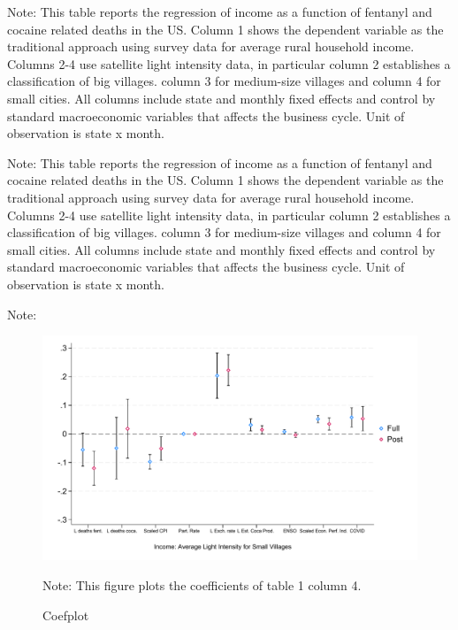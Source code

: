 \documentclass[12 pt,fullpage]{article}
\theoremstyle{plain}
\begin{document}
\newpage
\begin{table}[h!]
	\begin{center}
		\scalebox{0.6}{
			}
		\caption{}
	\end{center}
\end{table}
\vspace{-3mm}
\footnotesize Note: This table reports the regression of income as a function of fentanyl and cocaine related deaths in the US. Column 1 shows the dependent variable as the traditional approach using survey data for average rural household income. Columns 2-4 use satellite light intensity data, in particular column 2 establishes a classification of big villages. column 3 for medium-size villages and column 4 for small cities. All columns include state and monthly fixed effects and control by standard macroeconomic variables that affects the business cycle. Unit of observation is state x month. 

\newpage
\begin{table}[h!]
	\begin{center}
		\scalebox{0.6}{
			}
		\caption{}
	\end{center}
\end{table}
\vspace{-3mm}
\footnotesize Note: This table reports the regression of income as a function of fentanyl and cocaine related deaths in the US. Column 1 shows the dependent variable as the traditional approach using survey data for average rural household income. Columns 2-4 use satellite light intensity data, in particular column 2 establishes a classification of big villages. column 3 for medium-size villages and column 4 for small cities. All columns include state and monthly fixed effects and control by standard macroeconomic variables that affects the business cycle. Unit of observation is state x month. 

\newpage
\begin{table}[h!]
	\begin{center}
		\scalebox{0.6}{
			}
		\caption{}
	\end{center}
\end{table}
\vspace{-3mm}
\footnotesize Note:

\newpage
\begin{figure}[h!]
	\begin{center}
		\includegraphics[width=1\textwidth]{./Figures/Figure_coef_plot.pdf}
		\caption{Coefplot}
		\label{fig:coefplot} 
	\end{center}
	{\scriptsize Note: This figure plots the coefficients of table 1 column 4.}
\end{figure}
\end{document}
